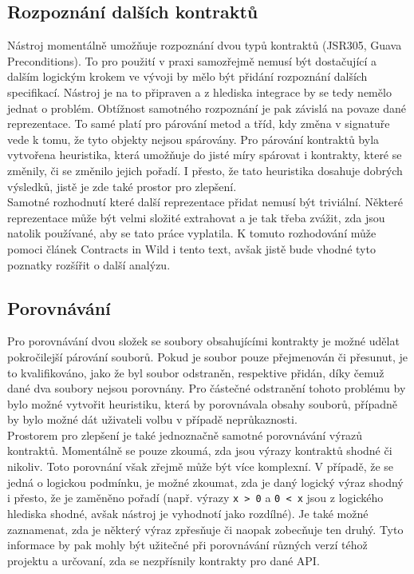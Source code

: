 		\subsection{Rozpoznání dalších kontraktů}
			Nástroj momentálně umožňuje rozpoznání dvou typů kontraktů (JSR305, Guava Preconditions). To pro použití v praxi samozřejmě nemusí být dostačující a dalším logickým krokem ve vývoji by mělo být přidání rozpoznání dalších specifikací. Nástroj je na to připraven a z hlediska integrace by se tedy nemělo jednat o problém. Obtížnost samotného rozpoznání je pak závislá na povaze dané reprezentace. To samé platí pro párování metod a tříd, kdy změna v signatuře vede k tomu, že tyto objekty nejsou spárovány. Pro párování kontraktů byla vytvořena heuristika, která umožňuje do jisté míry spárovat i kontrakty, které se změnily, či se změnilo jejich pořadí. I přesto, že tato heuristika dosahuje dobrých výsledků, jistě je zde také prostor pro zlepšení.\\
			
			Samotné rozhodnutí které další reprezentace přidat nemusí být triviální. Některé reprezentace může být velmi složité extrahovat a je tak třeba zvážit, zda jsou natolik používané, aby se tato práce vyplatila. K tomuto rozhodování může pomoci článek Contracts in Wild \cite{contractsInWild} i tento text, avšak jistě bude vhodné tyto poznatky rozšířit o další analýzu.
			
		\subsection{Porovnávání}
			Pro porovnávání dvou složek se soubory obsahujícími kontrakty je možné udělat pokročilejší párování souborů. Pokud je soubor pouze přejmenován či přesunut, je to kvalifikováno, jako že byl soubor odstraněn, respektive přidán, díky čemuž dané dva soubory nejsou porovnány. Pro částečné odstranění tohoto problému by bylo možné vytvořit heuristiku, která by porovnávala obsahy souborů, případně by bylo možné dát uživateli volbu v případě neprůkaznosti.\\
			
			Prostorem pro zlepšení je také jednoznačně samotné porovnávání výrazů kontraktů. Momentálně se pouze zkoumá, zda jsou výrazy kontraktů shodné či nikoliv. Toto porovnání však zřejmě může být více komplexní. V případě, že se jedná o logickou podmínku, je možné zkoumat, zda je daný logický výraz shodný i přesto, že je zaměněno pořadí (např. výrazy \texttt{x > 0} a \texttt{0 < x} jsou z logického hlediska shodné, avšak nástroj je vyhodnotí jako rozdílné). Je také možné zaznamenat, zda je některý výraz zpřesňuje či naopak zobecňuje ten druhý. Tyto informace by pak mohly být užitečné při porovnávání různých verzí téhož projektu a určovaní, zda se nezpřísnily kontrakty pro dané API.\\
			
